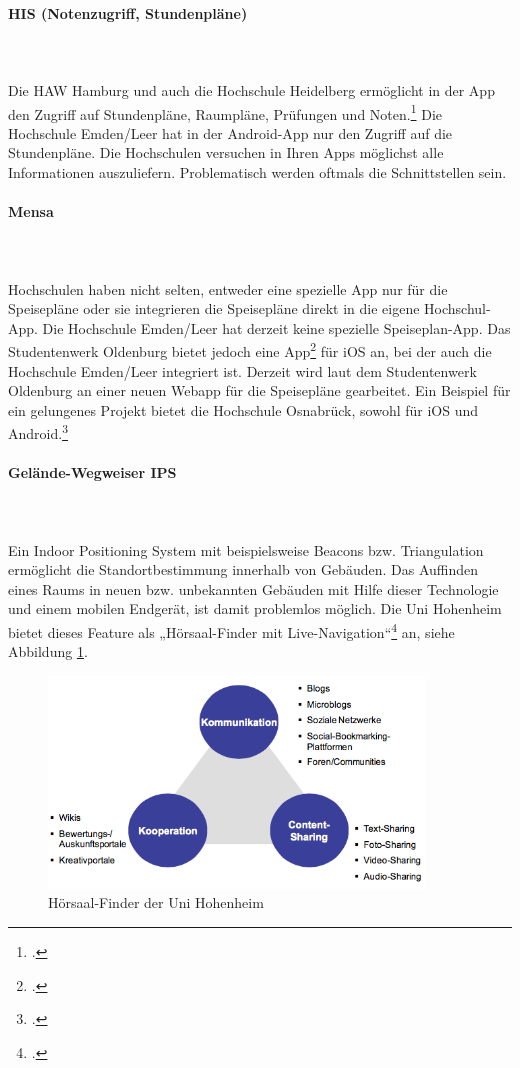 \paragraph{HIS (Notenzugriff, Stundenpläne)}\mbox{}\\\\
\label{paragraph_trends_his}
Die HAW Hamburg und auch die Hochschule Heidelberg ermöglicht in der App den Zugriff auf Stundenpläne, Raumpläne, Prüfungen und Noten.\footcite{akquinet_hawhamburg_2015} Die Hochschule Emden/Leer hat in der Android-App nur den Zugriff auf die Stundenpläne. Die Hochschulen versuchen in Ihren Apps möglichst alle Informationen auszuliefern. Problematisch werden oftmals die Schnittstellen sein. 

\paragraph{Mensa}\mbox{}\\\\ 
Hochschulen haben nicht selten, entweder eine spezielle App nur für die Speisepläne oder sie integrieren die Speisepläne direkt in die eigene Hochschul-App. Die Hochschule Emden/Leer hat derzeit keine spezielle Speiseplan-App. Das Studentenwerk Oldenburg bietet jedoch eine App\footcite{korte_mensaplanol_2009} für iOS an, bei der auch die Hochschule Emden/Leer integriert ist. Derzeit wird laut dem Studentenwerk Oldenburg an einer neuen Webapp für die Speisepläne gearbeitet. Ein Beispiel für ein gelungenes Projekt bietet die Hochschule Osnabrück, sowohl für iOS und Android.\footcite{ncn_studentenfutter_2013}

\paragraph{Gelände-Wegweiser IPS}\mbox{}\\\\
Ein Indoor Positioning System mit beispielsweise Beacons bzw. Triangulation ermöglicht die Standortbestimmung innerhalb von Gebäuden. Das Auffinden eines Raums in neuen bzw. unbekannten Gebäuden mit Hilfe dieser Technologie und einem mobilen Endgerät, ist damit problemlos möglich. Die Uni Hohenheim bietet dieses Feature als „Hörsaal-Finder mit Live-Navigation“\footcite{uni_hohenheim_itunes_2013} an, siehe Abbildung \ref{fig_livenavi}.

\begin{figure}[h!]
	\centering
	\includegraphics[width=10cm]{kapitel/gruppe1_2/bilder/nutzungsklassen}
	\caption{Hörsaal-Finder der Uni Hohenheim}
	\label{fig_livenavi}
\end{figure}


